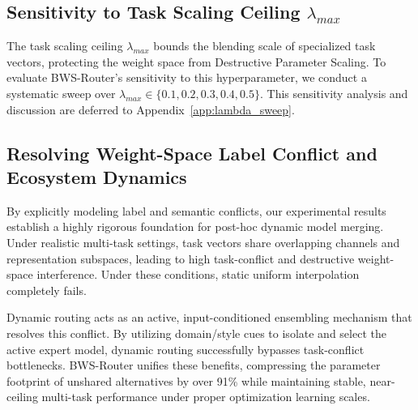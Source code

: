 \subsection{Sensitivity to Task Scaling Ceiling $\lambda_{max}$}
The task scaling ceiling $\lambda_{max}$ bounds the blending scale of specialized task vectors, protecting the weight space from Destructive Parameter Scaling. To evaluate BWS-Router's sensitivity to this hyperparameter, we conduct a systematic sweep over $\lambda_{max} \in \{0.1, 0.2, 0.3, 0.4, 0.5\}$. This sensitivity analysis and discussion are deferred to Appendix~\ref{app:lambda_sweep}.

\subsection{Resolving Weight-Space Label Conflict and Ecosystem Dynamics}
By explicitly modeling label and semantic conflicts, our experimental results establish a highly rigorous foundation for post-hoc dynamic model merging. Under realistic multi-task settings, task vectors share overlapping channels and representation subspaces, leading to high task-conflict and destructive weight-space interference. Under these conditions, static uniform interpolation completely fails. 

Dynamic routing acts as an active, input-conditioned ensembling mechanism that resolves this conflict. By utilizing domain/style cues to isolate and select the active expert model, dynamic routing successfully bypasses task-conflict bottlenecks. BWS-Router unifies these benefits, compressing the parameter footprint of unshared alternatives by over 91\% while maintaining stable, near-ceiling multi-task performance under proper optimization learning scales.
